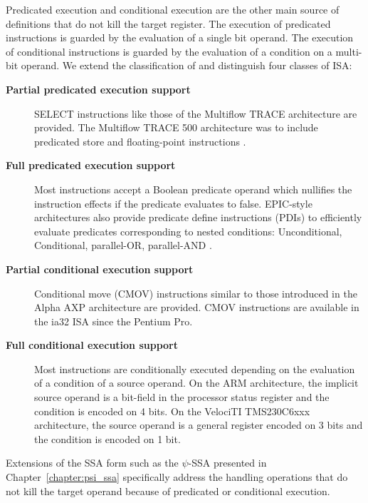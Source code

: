 Predicated execution and conditional execution are the other main source of
definitions that do not kill the target register. The execution of predicated
instructions is guarded by the evaluation of a single bit operand. The execution
of conditional instructions is guarded by the evaluation of a condition on a
multi-bit operand. We extend the classification of \cite{Mahlke:1995:ISCA} and
distinguish four classes of ISA: \begin{description}

\item[\bf Partial predicated execution support] SELECT instructions like those
of the Multiflow TRACE architecture \cite{Colwell:1987:ASPLOS} are provided. The
Multiflow TRACE 500 architecture was to include predicated store and
floating-point instructions \cite{Lowney:1993:JS}.

\item[\bf Full predicated execution support] Most instructions accept a Boolean
predicate operand which nullifies the instruction effects if the predicate
evaluates to false. EPIC-style architectures also provide predicate define
instructions (PDIs) to efficiently evaluate predicates corresponding to nested
conditions: Unconditional, Conditional, parallel-OR, parallel-AND
\cite{Gillies:1996:MICRO}.

\item[\bf Partial conditional execution support] Conditional move (CMOV)
instructions similar to those introduced in the Alpha AXP architecture
\cite{Blickstein:1992:DTJ} are provided. CMOV instructions are available in the
ia32 ISA since the Pentium Pro.

\item[\bf Full conditional execution support] Most instructions are
conditionally executed depending on the evaluation of a condition of a source
operand. On the ARM architecture, the implicit source operand is a bit-field in
the processor status register and the condition is encoded on 4 bits. On the
VelociTI{\texttrademark} TMS230C6xxx architecture, the source operand is a
general register encoded on 3 bits and the condition is encoded on 1 bit.

\end{description}
Extensions of the SSA form such as the $\psi$-SSA \cite{Stoutchinin:2001:MICRO}
presented in Chapter~\ref{chapter:psi_ssa} specifically address the handling
operations that do not kill the target operand because of predicated or
conditional execution.

